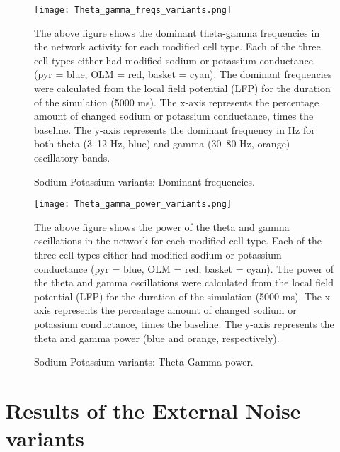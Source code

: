 \begin{figure}[htbp]
    \centering
    \texttt{[image: Theta\_gamma\_freqs\_variants.png]}
    \caption[Sodium-Potassium variants: Dominant frequencies]{Sodium-Potassium variants: Dominant frequencies.}\label{fig:sodium_potassium_frequencies}
    \begin{minipage}{0.9\textwidth}
        The above figure shows the dominant theta-gamma frequencies in the network activity for each modified cell type.
        Each of the three cell types either had modified sodium or potassium conductance (pyr = blue, OLM = red, basket = cyan).
        The dominant frequencies were calculated from the local field potential (LFP) for the duration of the simulation (5000 ms).
        The x-axis represents the percentage amount of changed sodium or potassium conductance, times the baseline.
        The y-axis represents the dominant frequency in Hz for both theta (3--12 Hz, blue) and gamma (30--80 Hz, orange) oscillatory bands.
    \end{minipage}
\end{figure}
\begin{figure}[htbp]
    \centering
    \texttt{[image: Theta\_gamma\_power\_variants.png]}
    \caption[Sodium-Potassium variants: Theta-Gamma power]{Sodium-Potassium variants: Theta-Gamma power.}\label{fig:sodium_potassium_power}
    \begin{minipage}{0.9\textwidth}
        The above figure shows the power of the theta and gamma oscillations in the network for each modified cell type.
        Each of the three cell types either had modified sodium or potassium conductance (pyr = blue, OLM = red, basket = cyan).
        The power of the theta and gamma oscillations were calculated from the local field potential (LFP) for the duration of the simulation (5000 ms).
        The x-axis represents the percentage amount of changed sodium or potassium conductance, times the baseline.
        The y-axis represents the theta and gamma power (blue and orange, respectively).
    \end{minipage}
\end{figure}
\pagebreak

\section{Results of the External Noise variants}



